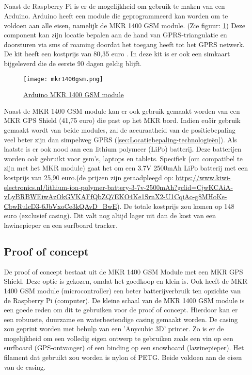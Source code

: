 \subsection{}
Naast de Raspberry Pi is er de mogelijkheid om gebruik te maken van een Arduino. Arduino heeft een module die geprogrammeerd kan worden om te voldoen aan alle eisen, namelijk de MKR 1400 GSM module. (Zie figuur: \ref{fig:mkr1400}) Deze component kan zijn locatie bepalen aan de hand van GPRS-triangulatie en doorsturen via sms of roaming doordat het toegang heeft tot het GPRS netwerk. De kit heeft een kostprijs van 80,35 euro \autocite{arduino}. In deze kit is er ook een simkaart bijgeleverd die de eerste 90 dagen geldig blijft.
\begin{figure}
    \texttt{[image: mkr1400gsm.png]}
    \caption{\href{https://store.arduino.cc/arduino-sim-mkr-gsm-1400-cellular-kit-1417?fbclid=IwAR0kJk6t6PVON-YakV_EiSOnb5y2RgBRQW0c6pVmpRw-hJlPRHO99qDdjSA}{Arduino MKR 1400 GSM module}}
    \label{fig:mkr1400}
\end{figure}
\newline
Naast de MKR 1400 GSM module kan er ook gebruik gemaakt worden van een MKR GPS Shield (41,75 euro) die past op het MKR bord. Indien eu5ir gebruik gemaakt wordt van beide modules, zal de accuraatheid van de positiebepaling veel beter zijn dan simpelweg GPRS (\ref{sec:Locatiebepaling-technologieën}). Als laatste is er ook nood aan een lithium polymeer (LiPo) batterij. Deze batterijen worden ook gebruikt voor gsm's, laptops en tablets. Specifiek (om compatibel te zijn met het MKR module) gaat het om een 3.7V 2500mAh LiPo batterij met een kostprijs van 25,90 euro.(de prijzen zijn geraadpleegd op: \url{https://www.kiwi-electronics.nl/lithium-ion-polymer-battery-3-7v-2500mAh?gclid=CjwKCAiA-vLyBRBWEiwAzOkGVKAFfQbZQ7EKO4Ke1SrnX2-U1CqiAo-g8MHoKe-CbwRulcD3-6JbVxoCe3kQAvD_BwE}).
\newline
De totale kostprijs zou komen op 148 euro (exclusief casing). Dit valt nog altijd lager uit dan de kost van een lawinepieper en een surfboard tracker.
\subsection{Proof of concept}
De proof of concept bestaat uit de MKR 1400 GSM Module met een MKR GPS Shield. Deze optie is gekozen, omdat het goedkoop en klein is. Ook heeft de MKR 1400 GSM module (microcontroller) een beter batterijverbruik ten opzichte van de Raspberry Pi (computer).
\newline
De kleine schaal van de MKR 1400 GSM module is een goede reden om dit te gebruiken voor de proof of concept. Hierdoor kan er een robuuste, duurzame en waterbestendige casing gemaakt worden. De casing zou geprint worden met behulp van een 'Anycubic 3D' printer. Zo is er de mogelijkheid om een volledig eigen ontwerp te gebruiken zoals een vin op een surfboard (GPS-ontvanger) of een binding op een snowboard (lawinepieper). Het filament dat gebruikt zou worden is nylon of PETG. Beide voldoen aan de eisen van de casing.